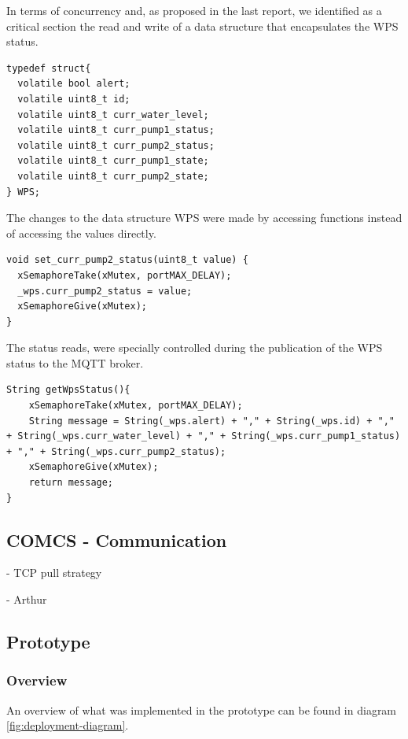 \documentclass[11pt]{article}
\begin{document}
In terms of concurrency and, as proposed in the last report, we identified as a critical section the read and write of a data structure that encapsulates the WPS status.

\begin{verbatim}
typedef struct{
  volatile bool alert;
  volatile uint8_t id;
  volatile uint8_t curr_water_level;
  volatile uint8_t curr_pump1_status;
  volatile uint8_t curr_pump2_status;  
  volatile uint8_t curr_pump1_state;
  volatile uint8_t curr_pump2_state;
} WPS;
\end{verbatim}

The changes to the data structure WPS were made by accessing functions instead of accessing the values directly.

\begin{verbatim}
void set_curr_pump2_status(uint8_t value) {
  xSemaphoreTake(xMutex, portMAX_DELAY);
  _wps.curr_pump2_status = value;
  xSemaphoreGive(xMutex);
}
\end{verbatim}

The status reads, were specially controlled during the publication of the WPS status to the MQTT broker.

\begin{verbatim}
String getWpsStatus(){
    xSemaphoreTake(xMutex, portMAX_DELAY);
    String message = String(_wps.alert) + "," + String(_wps.id) + "," + String(_wps.curr_water_level) + "," + String(_wps.curr_pump1_status) + "," + String(_wps.curr_pump2_status);
    xSemaphoreGive(xMutex);
    return message;
}
\end{verbatim}

\subsection{COMCS - Communication}

- TCP pull strategy

- Arthur

\subsection{Prototype}

\subsubsection{Overview}

An overview of what was implemented in the prototype can be found in diagram \ref{fig:deployment-diagram}.
\end{document}
